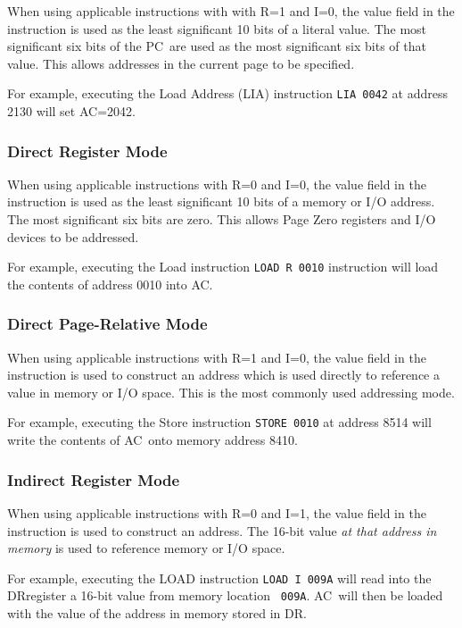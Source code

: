 \documentclass[11pt,a4paper,twocolumns]{article}
\newcommand\hex[1]{\textsf{#1}}
\newcommand\register[1]{\textsf{#1}}
\newcommand\A{\register{AC}}
\newcommand\DR{\register{DR}}
\newcommand\PC{\register{PC}}
\begin{document}
When using applicable instructions with with R=1 and I=0, the value
field in the instruction is used as the least significant 10 bits of a
literal value. The most significant six bits of the \PC\  are used as the
most significant six bits of that value. This allows addresses in the
current page to be specified.

For example, executing the Load Address (LIA) instruction {\tt LIA
  0042} at address \hex{2130} will set \A=\hex{2042}.

\subsubsection{Direct Register Mode}

When using applicable instructions with R=0 and I=0, the value field
in the instruction is used as the least significant 10 bits of a
memory or I/O address. The most significant six bits are zero. This
allows Page Zero registers and I/O devices to be addressed.

For example, executing the Load instruction {\tt LOAD R 0010}
instruction will load the contents of address \hex{0010} into \A.

\subsubsection{Direct Page-Relative Mode}

When using applicable instructions with R=1 and I=0, the value field
in the instruction is used to construct an address which is used
directly to reference a value in memory or I/O space. This is the most
commonly used addressing mode.

For example, executing the Store instruction {\tt STORE 0010} at
address \hex{8514} will write the contents of \A\  onto memory address
\hex{8410}.

\subsubsection{Indirect Register Mode}

When using applicable instructions with R=0 and I=1, the value field
in the instruction is used to construct an address. The 16-bit value
{\em at that address in memory\/} is used to reference memory or I/O
space.

For example, executing the LOAD instruction {\tt LOAD I 009A} will
read into the \DR register a 16-bit value from memory location {\tt
  009A}. \A\  will then be loaded with the value of the address in
memory stored in \DR.
\end{document}
